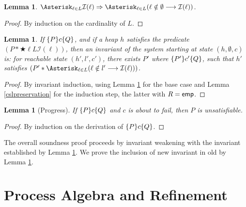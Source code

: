 \documentclass{amsbook}
\newtheorem{lemma}[theorem]{Lemma}
\theoremstyle{definition}
\theoremstyle{remark}
\numberwithin{section}{chapter}
\numberwithin{equation}{chapter}
\begin{document}
\begin{lemma}\label{nonelocked}
  $\bigstar{\ell}{L}{\mathcal I(\ell)} \Rightarrow \bigstarp{\ell}{L}{\guarded{\ell \notin \emptyset}{\mathcal I(\ell)}}$.
\end{lemma}
\begin{proof}
  By induction on the cardinality of $L$.
\end{proof}

\begin{lemma}\label{cslinvariant}
  If $\{P\} c \{Q\}$, and if a heap $h$ satisfies the predicate $(P * \bigstar{\ell}{L}{\mathcal I(\ell)})$, then an invariant of the system starting at state $(h, \emptyset, c)$ is: for reachable state $(h', l', c')$, there exists $P'$ where $\{P'\} c' \{Q\}$, such that $h'$ satisfies $(P' * \bigstarp{\ell}{L}{\guarded{\ell \notin l'}{\mathcal I(\ell)}})$.
\end{lemma}
\begin{proof}
  By invariant induction, using Lemma \ref{nonelocked} for the base case and Lemma \ref{cslpreservation} for the induction step, the latter with $R = \mathsf{emp}$.
\end{proof}

\begin{lemma}[Progress]\label{cslprogress}
  If $\{P\} c \{Q\}$ and $c$ is about to fail, then $P$ is unsatisfiable.
\end{lemma}
\begin{proof}
  By induction on the derivation of $\{P\} c \{Q\}$.
\end{proof}

The overall soundness proof proceeds by invariant weakening with the invariant established by Lemma \ref{cslinvariant}.
We prove the inclusion of new invariant in old by Lemma \ref{cslprogress}.



\chapter{\label{process_algebra}Process Algebra and Refinement}
\end{document}
